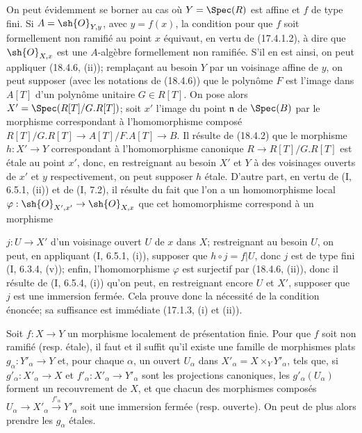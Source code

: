 On peut évidemment se borner au cas où $Y=\Spec(R)$ est affine et $f$ de type fini. Si $A=\sh{O}_{Y,y}$, avec $y=f(x)$, la condition pour que $f$ soit formellement non ramifié au point $x$ équivaut, en vertu de (17.4.1.2), à dire que $\sh{O}_{X,x}$ est une $A$-algèbre formellement non ramifiée. S'il en est ainsi, on peut appliquer (18.4.6, (ii)); remplaçant au besoin $Y$ par un voisinage affine de $y$, on peut supposer (avec les notations de (18.4.6)) que le polynôme $F$ est l'image dans $A[T]$ d'un polynôme unitaire $G\in R[T]$. On pose alors $X'=\Spec(R[T]/G.R[T])$; soit $x'$ l'image du point $\mathfrak n$ de $\Spec(B)$ par le morphisme correspondant à l'homomorphisme composé $R[T]/G.R[T]\to A[T]/F.A[T]\to B$. Il résulte de (18.4.2) que le morphisme $h:X'\to Y$ correspondant à l'homomorphisme canonique $R\to R[T]/G.R[T]$ est étale au point $x'$, donc, en restreignant au besoin $X'$ et $Y$ à des voisinages ouverts de $x'$ et $y$ respectivement, on peut supposer $h$ étale. D'autre part, en vertu de (I, 6.5.1, (ii)) et de (I, 7.2), il résulte du fait que l'on a un homomorphisme local $\varphi:\sh{O}_{X',x'}\to\sh{O}_{X,x}$ que cet homomorphisme correspond à un morphisme


$j:U\to X'$ d'un voisinage ouvert $U$ de $x$ dans $X$; restreignant au besoin $U$, on peut, en appliquant (I, 6.5.1, (i)), supposer que $h\circ j=f|U$, donc $j$ est de type fini (I, 6.3.4, (v)); enfin, l'homomorphisme $\varphi$ est surjectif par (18.4.6, (ii)), donc il résulte de (I, 6.5.4, (i)) qu'on peut, en restreignant encore $U$ et $X'$, supposer que $j$ est une immersion fermée. Cela prouve donc la nécessité de la condition énoncée; sa suffisance est immédiate (17.1.3, (i) et (ii)).

\begin{corollary}[18.4.8]
\label{IV.18.4.8}
Soit $f:X\to Y$ un morphisme localement de présentation finie. Pour que $f$ soit non ramifié (resp. étale), il faut et il suffit qu'il existe une famille de morphismes plats $g_\alpha:Y'_\alpha\to Y$ et, pour chaque $\alpha$, un ouvert $U_\alpha$ dans $X'_\alpha=X\times_Y Y'_\alpha$, tels que, si $g'_\alpha:X'_\alpha\to X$ et $f'_\alpha:X'_\alpha\to Y'_\alpha$ sont les projections canoniques, les $g'_\alpha(U_\alpha)$ forment un recouvrement de $X$, et que chacun des morphismes composés $U_\alpha\to X'_\alpha\xrightarrow{f'_\alpha}Y'_\alpha$ soit une immersion fermée (resp. ouverte). On peut de plus alors prendre les $g_\alpha$ étales.
\end{corollary}

